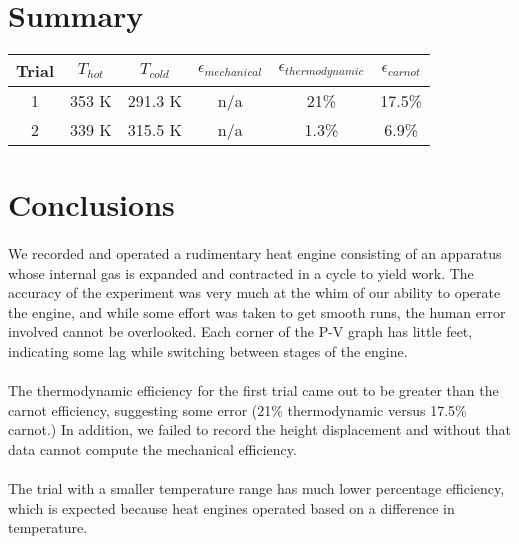 \documentclass[11pt,letterpaper]{report}
\begin{document}

\pagebreak

\section*{Summary}
\begin{tabular}{ | c | c | c | c | c | c | }
\hline
Trial & $T_{hot}$ & $T_{cold}$ & $\epsilon_{mechanical}$ & $\epsilon_{thermodynamic}$ & $\epsilon_{carnot}$ \\
\hline
1 & 353 K & 291.3 K & n/a & 21\% & 17.5\% \\
\hline
2 & 339 K & 315.5 K & n/a & 1.3\% & 6.9\% \\
\hline
\end{tabular}


\section*{Conclusions}
\paragraph{}
We recorded and operated a rudimentary heat engine consisting of an apparatus whose internal gas is expanded and contracted in a cycle to yield work. The accuracy of the experiment was very much at the whim of our ability to operate the engine, and while some effort was taken to get smooth runs, the human error involved cannot be overlooked. Each corner of the P-V graph has little feet, indicating some lag while switching between stages of the engine.
\paragraph{}
The thermodynamic efficiency for the first trial came out to be greater than the carnot efficiency, suggesting some error (21\% thermodynamic versus 17.5\% carnot.) In addition, we failed to record the height displacement and without that data cannot compute the mechanical efficiency.
\paragraph{}
The trial with a smaller temperature range has much lower percentage efficiency, which is expected because heat engines operated based on a difference in temperature.
\end{document}
